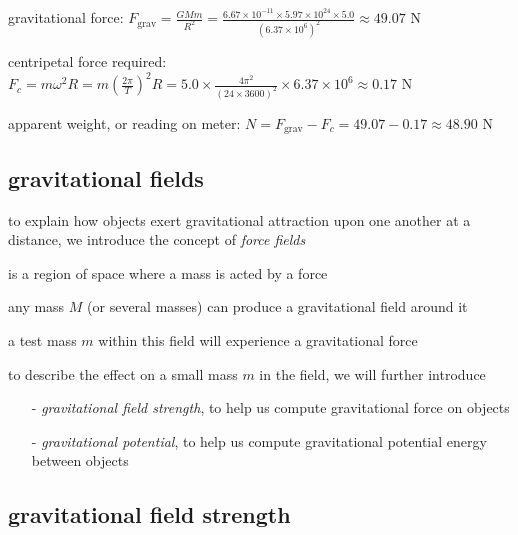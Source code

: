 \sol gravitational force: $F_\text{grav} = \frac{GMm}{R^2} = \frac{6.67\times10^{-11}\times5.97\times10^{24}\times5.0}{(6.37\times10^6)^2} \approx 49.07 \text{ N}$

centripetal force required: $F_c = m\omega^2 R = m\left(\frac{2\pi}{T}\right)^2R = 5.0\times\frac{4\pi^2}{(24\times3600)^2}\times6.37\times10^6 \approx 0.17 \text{ N}$

apparent weight, or reading on meter: $N = F_\text{grav} - F_c = 49.07 - 0.17 \approx 48.90 \text{ N}$ \eoe




\subsection{gravitational fields}

to explain how objects exert gravitational attraction upon one another at a distance, we introduce the concept of \emph{force fields}

\begin{ilight}
	 is a region of space where a mass is acted by a force
\end{ilight}

any mass $M$ (or several masses) can produce a gravitational field around it

a test mass $m$ within this field will experience a gravitational force

\vspace*{\baselineskip}

to describe the effect on a small mass $m$ in the field, we will further introduce
\begin{itemize}
	\item[-] \emph{gravitational field strength}, to help us compute gravitational force on objects
	
	\item[-] \emph{gravitational potential}, to help us compute gravitational potential energy between objects
\end{itemize}


\subsection{gravitational field strength}

